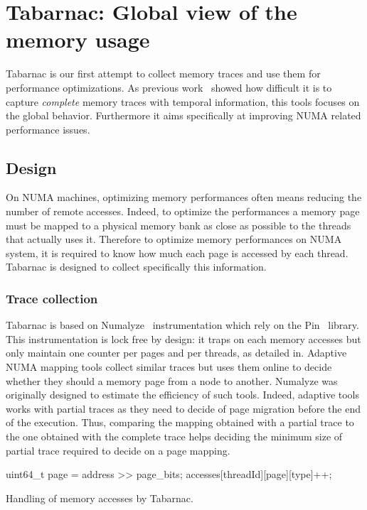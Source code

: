 \section{Tabarnac: Global view of the memory usage}
\label{sec:Tabarnac}

\acrfull{Tabarnac} is our first attempt to collect memory traces and use them for performance optimizations.
As previous work~\cite{Beniamine13Cartographier} showed how difficult it is to capture \emph{complete} memory traces with temporal information, this tools focuses on the global behavior.
Furthermore it aims specifically at improving \gls{NUMA} related performance issues.

\subsection{Design}

On \gls{NUMA} machines, optimizing memory performances often means reducing the number of remote accesses.
Indeed, to optimize the performances a memory page must be mapped to a physical memory bank as close as possible to the threads that actually uses it.
Therefore to optimize memory performances on \gls{NUMA} system, it is required to know how much each page is accessed by each thread.
\gls{Tabarnac} is designed to collect specifically this information.

\subsubsection{Trace collection}

\gls{Tabarnac} is based on \gls{Numalyze}~\cite{Diener15Characterizing} instrumentation which rely on the \gls{Pin}~\cite{Luk05Pin} library.
This instrumentation is lock free by design: it traps on each memory accesses but only maintain one counter per pages and per threads, as detailed in.
Adaptive \gls{NUMA} mapping tools collect similar traces but uses them online to decide whether they should a memory page from a node to another.
\gls{Numalyze} was originally designed to estimate the efficiency of such tools.
Indeed, adaptive tools works with partial traces as they need to decide of page migration before the end of the execution.
Thus, comparing the mapping obtained with a partial trace to the one obtained with the complete trace helps deciding the minimum size of partial trace required to decide on a page mapping.

\begin{algorithm}[htb]
    \begin{algorithmic}
            \State uint64\_t page = address >> page\_bits;
            \State accesses[threadId][page][type]++;
        \EndFunction
    \end{algorithmic}
    \caption{Handling of memory accesses by Tabarnac.}
    \label{alg:Tabarnac}
\end{algorithm}


